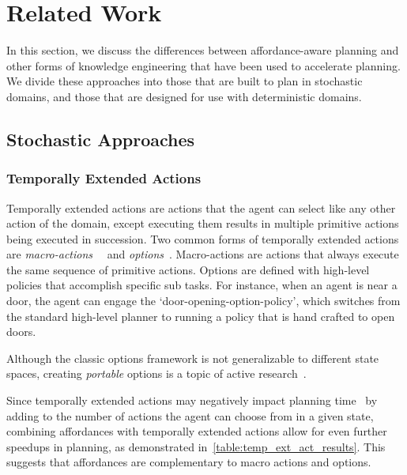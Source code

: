 \documentclass[conference]{IEEEtran}
\begin{document}
\section{Related Work}
\label{sec:related-work}

In this section, we discuss the differences between
affordance-aware planning and other forms of knowledge engineering that
have been used to accelerate planning. We divide these approaches
into those that are built to plan in stochastic domains, and those that are
designed for use with deterministic domains.

\subsection{Stochastic Approaches}

\subsubsection{Temporally Extended Actions}
Temporally extended actions are actions that the agent can
select like any other action of the domain, except executing them
results in multiple primitive actions being executed in
succession. Two common forms of temporally extended actions are {\em
  macro-actions}~\cite{hauskrecht98} ~and {\em options}~\cite{sutton99}. 
Macro-actions are actions that always
execute the same sequence of primitive actions. Options are defined
with high-level policies that accomplish specific sub tasks. For
instance, when an agent is near a door, the agent can engage the
`door-opening-option-policy', which switches from the standard
high-level planner to running a policy that is hand crafted to open
doors. 

Although the classic options framework is not generalizable to different state spaces,
creating {\em portable} options is a topic of active research~\cite{konidaris07,konidaris2009efficient,Ravindran03analgebraic,croonenborghs2008learning,andre2002state,konidaris2012transfer}.

Since temporally extended actions may negatively impact planning time~\cite{Jong:2008zr} by adding to the number of actions the agent can choose from in a given state, combining affordances with temporally extended actions allow for even further speedups in planning, as demonstrated in~\ref{table:temp_ext_act_results}. This suggests that affordances are complementary to macro actions and options.
\end{document}
